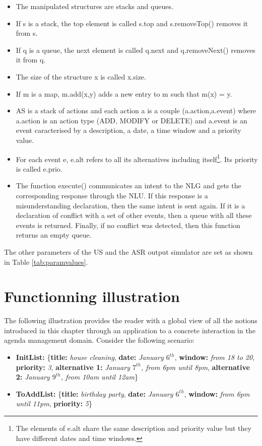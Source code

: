 				\begin{itemize}
					\item The manipulated structures are stacks and queues.
					\item If s is a stack, the top element is called s.top and s.removeTop() removes it from s.
					\item If q is a queue, the next element is called q.next and q.removeNext() removes it from q.
					\item The size of the structure x is called x.size.
					\item If m is a map, m.add(x,y) adds a new entry to m such that m(x) = y.
					\item AS is a stack of actions and each action a is a couple (a.action,a.event) where a.action is an action type (ADD, MODIFY or DELETE) and a.event is an event caracterised by a description, a date, a time window and a priority value.
					\item For each event e, e.alt refers to all its alternatives including itself\footnote{The elements of e.alt share the same description and priority value but they have different dates and time windows.}. Its priority is called e.prio.
					\item The function execute() communicates an intent to the NLG and gets the corresponding response through the NLU. If this response is a misunderstanding declaration, then the same intent is sent again. If it is a declaration of conflict with a set of other events, then a queue with all these events is returned. Finally, if no conflict was detected, then this function returns an empty queue.
				\end{itemize}
						
					The other parameters of the US and the ASR output simulator are set as shown in Table \ref{tab:paramvalues}.
					
\section{Functionning illustration}
			
				The following illustration provides the reader with a global view of all the notions introduced in this chapter through an application to a concrete interaction in the agenda management domain. Consider the following scenario:
				
				\begin{itemize}
					\item \textbf{InitList:} \{\textbf{title:} \textit{house cleaning}, \textbf{date:} \textit{January $6^{th}$}, \textbf{window:} \textit{from 18 to 20}, \textbf{priority:} \textit{3}, \textbf{alternative 1:} \textit{January $7^{th}$, from 6pm until 8pm}, \textbf{alternative 2:} \textit{January $9^{th}$, from 10am until 12am}\}
					\item \textbf{ToAddList:} \{\textbf{title:} \textit{birthday party}, \textbf{date:} \textit{January $6^{th}$}, \textbf{window:} \textit{from 6pm until 11pm}, \textbf{priority:} \textit{5}\}
				\end{itemize}
				
